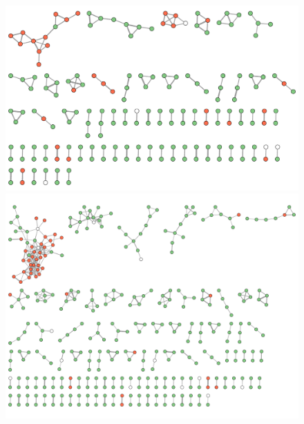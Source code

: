 \begin{figure}[H]
    \centering
  \begin{minipage}[b]{0.6\textwidth}
    \centering
    \includegraphics[width=\textwidth]{include/img/appendix/nets_opt/NR.AR_cos0.1bin_min0.7_10link.pdf}
  \end{minipage}
  \hfill
  \begin{minipage}[b]{0.6\textwidth}
    \centering
    \includegraphics[width=\textwidth]{include/img/appendix/nets_opt/NR.AR_cos0.1bin_min0.6_10link.pdf}
  \end{minipage}
  \hfill
  \begin{minipage}[b]{0.6\textwidth}
    \centering

\end{minipage}
\end{figure}
